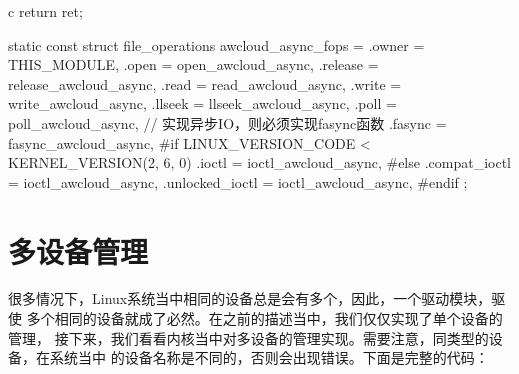 \begin{code-block}{c}
{        return ret;
}

static const struct file_operations awcloud_async_fops = {
        .owner          = THIS_MODULE,
        .open           = open_awcloud_async,
        .release        = release_awcloud_async,
        .read           = read_awcloud_async,
        .write          = write_awcloud_async,
        .llseek         = llseek_awcloud_async,
        .poll           = poll_awcloud_async,
        // 实现异步IO，则必须实现fasync函数
        .fasync         = fasync_awcloud_async,
#if LINUX_VERSION_CODE < KERNEL_VERSION(2, 6, 0)
        .ioctl          = ioctl_awcloud_async,
#else
        .compat_ioctl   = ioctl_awcloud_async,
        .unlocked_ioctl = ioctl_awcloud_async,
#endif
};
\end{code-block}

\section{多设备管理}
很多情况下，Linux系统当中相同的设备总是会有多个，因此，一个驱动模块，驱使
多个相同的设备就成了必然。在之前的描述当中，我们仅仅实现了单个设备的管理，
接下来，我们看看内核当中对多设备的管理实现。需要注意，同类型的设备，在系统当中
的设备名称是不同的，否则会出现错误。下面是完整的代码：
